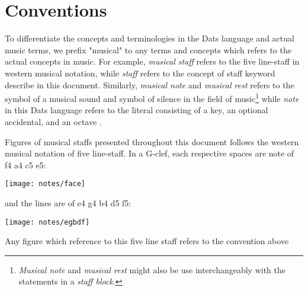 \section{Conventions}

\np To differentiate the concepts and terminologies in the Dats language and
actual music terms, we prefix "musical" to any terms and concepts which
refers to the actual concepts in music. For example, \textit{musical staff} refers
to the five line-staff in western musical notation, while \textit{staff} refers to
the concept of staff keyword describe in this document. Similarly,
\textit{musical note} and \textit{musical rest} refers to the symbol of a musical
sound and symbol of silence in the field of music\footnote{\textit{Musical note} and
\textit{musical rest} might also be use interchangeably with the statements in a
\textit{staff block}.} while \textit{note} in this Dats language refers to the literal
consisting of a key, an optional accidental, and an octave \protect{}.
 
\np Figures of musical staffs presented throughout this document follows the
western musical notation of five line-staff. In a G-clef, each respective
spaces are note of f4 a4 c5 e5:

\begin{center}
\texttt{[image: notes/face]}
\end{center}

and the lines are of e4 g4 b4 d5 f5:

\begin{center}
\texttt{[image: notes/egbdf]}
\end{center}

Any figure which reference to this five line staff refers to the convention above



